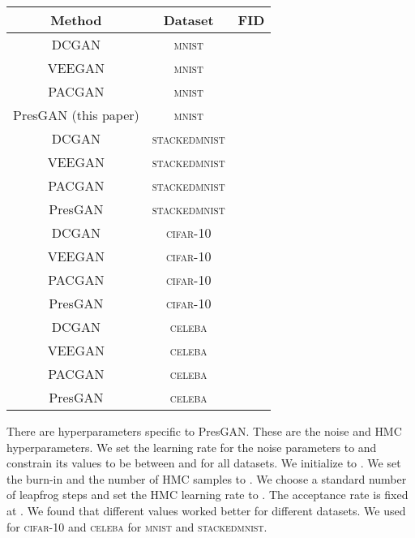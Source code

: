 \documentclass[11pt]{article}
\begin{document}
\begin{table*}[t]
	\centering
	\small
	\begin{tabular}{ccc}
	\toprule
	 Method & Dataset &  \acrshort{FID} \\
	 \hline
	 \acrshort{DCGAN} \citep{radford2015unsupervised} & \textsc{mnist} &  \\
	 \acrshort{VEEGAN} \citep{srivastava2017veegan} & \textsc{mnist} &  \\
	  \acrshort{PACGAN}   \citep{lin2018pacgan}  & \textsc{mnist} &  \\
	  Pres\acrshort{GAN} (this paper) & \textsc{mnist} &  \\
	  \hline
	  \acrshort{DCGAN}  & \textsc{stackedmnist} &  \\
	 \acrshort{VEEGAN} & \textsc{stackedmnist} &   \\
	  \acrshort{PACGAN} & \textsc{stackedmnist} &  \\
	  Pres\acrshort{GAN} & \textsc{stackedmnist} &  \\
	  \hline
	  \acrshort{DCGAN}  & \textsc{cifar}-10 &   \\
	 \acrshort{VEEGAN} & \textsc{cifar}-10 &   \\
	  \acrshort{PACGAN} & \textsc{cifar}-10 &   \\
	  Pres\acrshort{GAN} & \textsc{cifar}-10 &  \\
	  \hline
	  \acrshort{DCGAN}  & \textsc{celeba} &  \\
	 \acrshort{VEEGAN} & \textsc{celeba} &   \\
	  \acrshort{PACGAN} & \textsc{celeba} &  \\
	  Pres\acrshort{GAN} & \textsc{celeba} &  \\
	\bottomrule
	\end{tabular}
	\label{tab:fid}
\end{table*}

There are hyperparameters specific to Pres\gls{GAN}. These are the noise and \gls{HMC} hyperparameters. We set the learning rate for the noise parameters  to  and constrain its values to be between  and  for all datasets. We initialize  to . We set the burn-in and the number of \gls{HMC} samples to . We choose a standard number of  leapfrog steps and set the \gls{HMC} learning rate to . The acceptance rate is fixed at . We found that different  values worked better for different datasets. We used  for \textsc{cifar}-10 and \textsc{celeba}  for \textsc{mnist} and \textsc{stackedmnist}.
\end{document}
